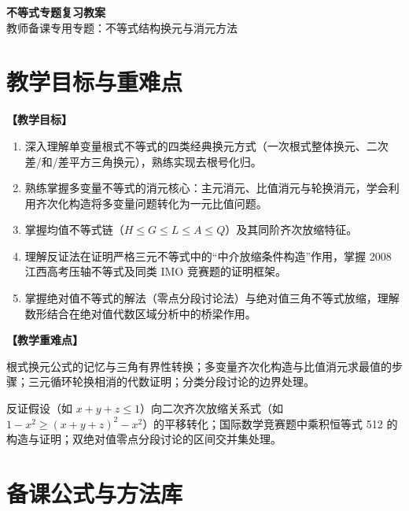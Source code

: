 \documentclass[12pt,a4paper]{ctexart}
\begin{document}
\begin{center}
  {\Large\bfseries 不等式专题复习教案}\\
  \vspace{0.6em}
  {\large 教师备课专用\quad 专题：不等式结构换元与消元方法}
\end{center}

\section{教学目标与重难点}
\textbf{【教学目标】}
\begin{enumerate}[label=\arabic*. , leftmargin=2em, itemsep=0.1em, topsep=0.2em]
  \item 深入理解单变量根式不等式的四类经典换元方式（一次根式整体换元、二次差/和/差平方三角换元），熟练实现去根号化归。
  \item 熟练掌握多变量不等式的消元核心：主元消元、比值消元与轮换消元，学会利用齐次化构造将多变量问题转化为一元比值问题。
  \item 掌握均值不等式链（\(H \leqslant G \leqslant L \leqslant A \leqslant Q\)）及其同阶齐次放缩特征。
  \item 理解反证法在证明严格三元不等式中的“中介放缩条件构造”作用，掌握 2008 江西高考压轴不等式及同类 IMO 竞赛题的证明框架。
  \item 掌握绝对值不等式的解法（零点分段讨论法）与绝对值三角不等式放缩，理解数形结合在绝对值代数区域分析中的桥梁作用。
\end{enumerate}

\vspace{0.8em}
\textbf{【教学重难点】}
\begin{description}[leftmargin=2em, itemsep=0.1em, topsep=0.2em]
  \item[重点] 根式换元公式的记忆与三角有界性转换；多变量齐次化构造与比值消元求最值的步骤；三元循环轮换相消的代数证明；分类分段讨论的边界处理。
  \item[难点] 反证假设（如 \(x+y+z \leqslant 1\)）向二次齐次放缩关系式（如 \(1-x^2 \geqslant (x+y+z)^2-x^2\)）的平移转化；国际数学竞赛题中乘积恒等式 512 的构造与证明；双绝对值零点分段讨论的区间交并集处理。
\end{description}

\newpage

\section{备课公式与方法库}
\end{document}
